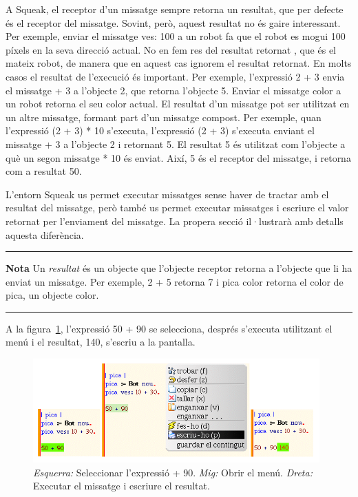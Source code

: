 A Squeak, el receptor d'un missatge sempre retorna un resultat, que per defecte és el receptor del missatge. Sovint, però, aquest resultat no és gaire interessant. Per exemple, enviar el missatge \textsf{ves: 100} a un robot fa que el robot es mogui 100 píxels en la seva direcció actual. No en fem res del resultat retornat , que és el mateix robot, de manera que en aquest cas ignorem el resultat retornat. En molts casos el resultat de l'execució és important. Per exemple, l'expressió \textsf{2 + 3} envia el missatge \textsf{+ 3} a l'objecte \textsf{2}, que retorna l'objecte \textsf{5}. Enviar el missatge \textsf{color} a un robot retorna el seu color actual. El resultat d'un missatge pot ser utilitzat en un altre missatge, formant part d'un missatge compost. Per exemple, quan l'expressió \textsf{(2 + 3) * 10} s'executa, l'expressió \textsf{(2 + 3)} s'executa enviant el missatge \textsf{+ 3} a l'objecte \textsf{2} i retornant \textsf{5}. El resultat \textsf{5} és utilitzat com l'objecte a què un segon missatge \textsf{* 10} és enviat. Així, \textsf{5} és el receptor del missatge, i retorna com a resultat \textsf{50}.

L'entorn Squeak us permet executar missatges sense haver de tractar amb el resultat del missatge, però també us permet executar missatges i escriure el valor retornat per l'enviament del missatge. La propera secció il·lustrarà amb detalls aquesta diferència.

\vspace*{5mm}

\noindent
\rule{\textwidth}{2pt}
\noindent
\textbf{Nota} Un \emph{resultat} és un objecte que l'objecte receptor retorna a l'objecte que li ha enviat un missatge. Per exemple, \textsf{2 + 5} retorna \textsf{7} i \textsf{pica color} retorna el color de \textsf{pica}, un objecte color.
\noindent
\rule{\textwidth}{2pt}

\newpage

A la figura~\ref{fig0509}, l'expressió \textsf{50 + 90} se selecciona, després s'executa utilitzant el menú i el resultat, \textsf{140}, s'escriu a la pantalla.
\begin{figure}[h!]
\begin{center}
\includegraphics[height=40mm ,width=110mm ]{Imatges/figura5-9.png}
\end{center}
\caption{
\emph{Esquerra:} Seleccionar l'expressió \textsf{ + 90}.
\emph{Mig:} Obrir el menú.
\emph{Dreta:} Executar el missatge i escriure el resultat.
}
\label{fig0509}
\end{figure}

